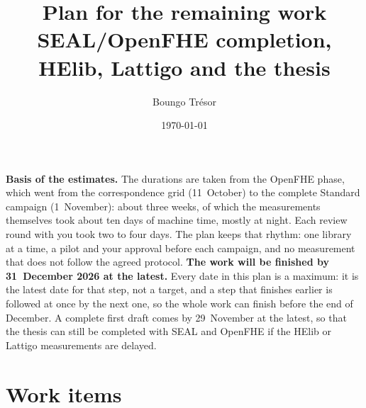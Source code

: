 \documentclass[11pt]{article}
\title{Plan for the remaining work\\[2pt]\large SEAL/OpenFHE completion, HElib, Lattigo and the thesis}
\author{Boungo Tr\'esor}
\date{\today}
\begin{document}
\maketitle

\noindent\textbf{Basis of the estimates.} The durations are taken from the OpenFHE phase, which went from the correspondence grid (11~October) to the complete Standard campaign (1~November): about three weeks, of which the measurements themselves took about ten days of machine time, mostly at night. Each review round with you took two to four days. The plan keeps that rhythm: one library at a time, a pilot and your approval before each campaign, and no measurement that does not follow the agreed protocol. \textbf{The work will be finished by 31~December 2026 at the latest.} Every date in this plan is a maximum: it is the latest date for that step, not a target, and a step that finishes earlier is followed at once by the next one, so the whole work can finish before the end of December. A complete first draft comes by 29~November at the latest, so that the thesis can still be completed with SEAL and OpenFHE if the HElib or Lattigo measurements are delayed.

\section{Work items}
\end{document}

